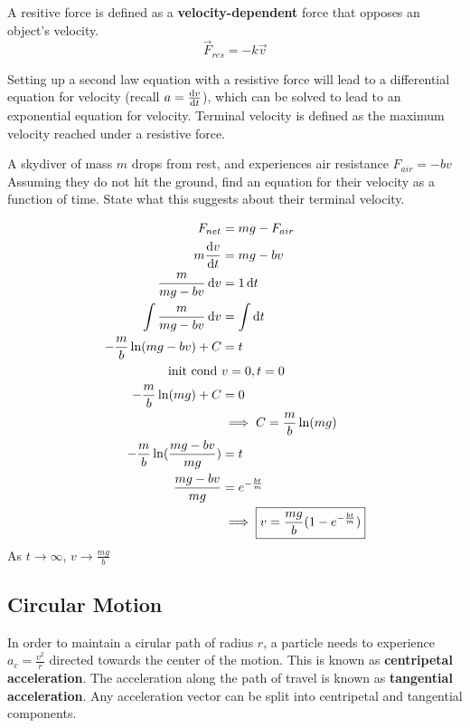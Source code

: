 \documentclass{article}
\begin{document}
A resitive force is defined as a \textbf{velocity-dependent} force that opposes an object's velocity.
\[\vec{F}_{res}  = -k\vec{v}\]

Setting up a second law equation with a resistive force will lead to a differential equation for velocity (recall $a = \odv{v}{t}$), which can be solved to lead to an exponential equation for velocity.
Terminal velocity is defined as the maximum velocity reached under a resistive force.

\begin{example}
    A skydiver of mass $m$ drops from rest, and experiences air resistance $F_{air} = -bv$
    Assuming they do not hit the ground, find an equation for their velocity as a function of time.
    State what this suggests about their terminal velocity.
\end{example}
\begin{answer}
    \begin{align*}
        F_{net} &= mg - F_{air} \\
        m \odv{v}{t} &= mg - bv \\
        \frac{m}{mg - bv} \odif{v} &= 1 \odif{t} \\
        \int \frac{m}{mg - bv} \odif{v} &= \int \odif{t} \\
        -\frac{m}{b} \ln(mg - bv) + C &= t \\
        \textrm{init cond } &v = 0, t=0 \\
        -\frac{m}{b} \ln(mg) + C &= 0 \\
        &\implies C = \frac{m}{b}\ln(mg) \\
        -\frac{m}{b} \ln(\frac{mg - bv}{mg}) &= t \\
        \frac{mg - bv}{mg} &= e^{-\frac{bt}{m}} \\
        &\implies \boxed{v = \frac{mg}{b} (1 - e^{-\frac{bt}{m}})} \\
    \end{align*}
    As $t \rightarrow \infty$, $\boxed{v \rightarrow \frac{mg}{b}}$
\end{answer}

\subsection{Circular Motion}
In order to maintain a cirular path of radius $r$, a particle needs to experience $a_c = \frac{v^2}{r}$ directed towards the center of the motion.
This is known as \textbf{centripetal acceleration}.
The acceleration along the path of travel is known as \textbf{tangential acceleration}.
Any acceleration vector can be split into centripetal and tangential components.
\end{document}
